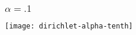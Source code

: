 \documentclass[11pt,compress,professionalfonts]{beamer}
\newcommand{\ita}{\begin{itemize}}
\newcommand{\itm}{\item[]}
\newcommand{\itz}{\end{itemize}}
\begin{document}
\begin{frame}[t,fragile]\frametitle{$\alpha=.1$}

\centerline{\texttt{[image: dirichlet-alpha-tenth]}}





%
%
%
%
%
%

%
%
%
%
%
%
%
%
%
%
%
%
%
%
%
%
%
%
%
%
%
%
%
%
%
%



\end{frame}
\end{document}
